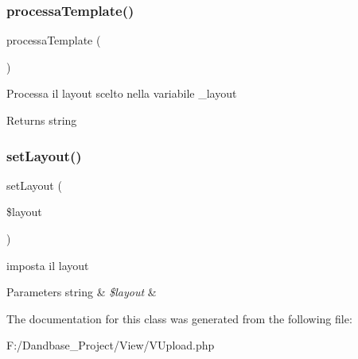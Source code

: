 \subsubsection{\texorpdfstring{processa\+Template()}{processaTemplate()}}
{\footnotesize\ttfamily processa\+Template (\begin{DoxyParamCaption}{ }\end{DoxyParamCaption})}

Processa il layout scelto nella variabile \+\_\+layout

\begin{DoxyReturn}{Returns}
string 
\end{DoxyReturn}
\mbox{\label{class_v_upload_a702b3376618a26e6c02c05bae65c6b9e}} 
\subsubsection{\texorpdfstring{set\+Layout()}{setLayout()}}
{\footnotesize\ttfamily set\+Layout (\begin{DoxyParamCaption}\item[{}]{\$layout }\end{DoxyParamCaption})}

imposta il layout


\begin{DoxyParams}[1]{Parameters}
string & {\em \$layout} & \\
\hline
\end{DoxyParams}


The documentation for this class was generated from the following file\+:\begin{DoxyCompactItemize}
\item 
F\+:/\+Dandbase\+\_\+\+Project/\+View/V\+Upload.\+php\end{DoxyCompactItemize}
